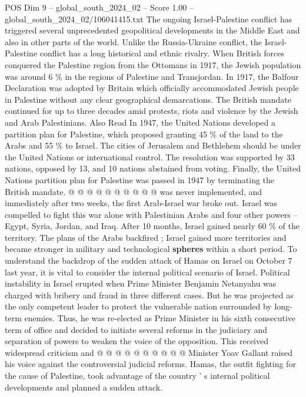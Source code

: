 \begin{textsample}{POS Dim 9 – global\_south\_2024\_02 – Score 1.00 – global\_south\_2024\_02/106041415.txt}  \label{ex:f9_pos_097}
The ongoing Israel-Palestine conflict has triggered several unprecedented geopolitical developments in the Middle East and also in other parts of the world.
Unlike the Russia-Ukraine conflict, the Israel-Palestine conflict has a long historical and ethnic rivalry.
When British forces conquered the Palestine region from the Ottomans in 1917, the Jewish population was around 6 \% in the regions of Palestine and Transjordan.
In 1917, the Balfour Declaration was adopted by Britain which officially accommodated Jewish people in Palestine without any clear geographical demarcations.
The British mandate continued for up to three decades amid protests, riots and violence by the Jewish and Arab Palestinians.
Also Read In 1947, the United Nations developed a partition plan for Palestine, which proposed granting 45 \% of the land to the Arabs and 55 \% to Israel.
The cities of Jerusalem and Bethlehem should be under the United Nations or international control.
The resolution was supported by 33 nations, opposed by 13, and 10 nations abstained from voting.
Finally, the United Nations partition plan for Palestine was passed in 1947 by terminating the British mandate. @ @ @ @ @ @ @ @ @ @ was never implemented, and immediately after two weeks, the first Arab-Israel war broke out.
Israel was compelled to fight this war alone with Palestinian Arabs and four other powers -- Egypt, Syria, Jordan, and Iraq.
After 10 months, Israel gained nearly 60 \% of the territory.
The plans of the Arabs backfired ; Israel gained more territories and became stronger in military and technological \textbf{spheres} within a short period.
To understand the backdrop of the sudden attack of Hamas on Israel on October 7 last year, it is vital to consider the internal political scenario of Israel.
Political instability in Israel erupted when Prime Minister Benjamin Netanyahu was charged with bribery and fraud in three different cases.
But he was projected as the only competent leader to protect the vulnerable nation surrounded by long-term enemies.
Thus, he was re-elected as Prime Minister in his sixth consecutive term of office and decided to initiate several reforms in the judiciary and separation of powers to weaken the voice of the opposition.
This received widespread criticism and @ @ @ @ @ @ @ @ @ @ Minister Yoav Gallant raised his voice against the controversial judicial reforms.
Hamas, the outfit fighting for the cause of Palestine, took advantage of the country ' s internal political developments and planned a sudden attack.

\end{textsample}
